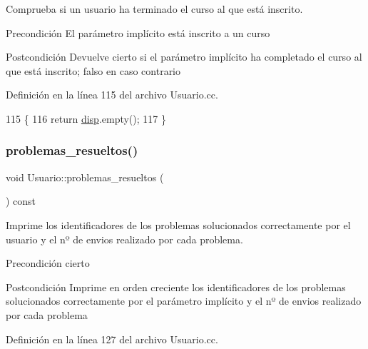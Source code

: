 Comprueba si un usuario ha terminado el curso al que está inscrito. 

\begin{DoxyPrecond}{Precondición}
El parámetro implícito está inscrito a un curso 
\end{DoxyPrecond}
\begin{DoxyPostcond}{Postcondición}
Devuelve cierto si el parámetro implícito ha completado el curso al que está inscrito; falso en caso contrario 
\end{DoxyPostcond}


Definición en la línea 115 del archivo Usuario.\+cc.


\begin{DoxyCode}
115                                        \{
116         \textcolor{keywordflow}{return} \mbox{\hyperlink{class_usuario_a4402178ca5b057733c675e3849718e96}{disp}}.empty();
117       \}
\end{DoxyCode}
\mbox{\label{class_usuario_a11b719ee95e8089a4f34c172c81f2a5b}} 
\subsubsection{\texorpdfstring{problemas\+\_\+resueltos()}{problemas\_resueltos()}}
{\footnotesize\ttfamily void Usuario\+::problemas\+\_\+resueltos (\begin{DoxyParamCaption}{ }\end{DoxyParamCaption}) const}



Imprime los identificadores de los problemas solucionados correctamente por el usuario y el nº de envios realizado por cada problema. 

\begin{DoxyPrecond}{Precondición}
cierto 
\end{DoxyPrecond}
\begin{DoxyPostcond}{Postcondición}
Imprime en orden creciente los identificadores de los problemas solucionados correctamente por el parámetro implícito y el nº de envios realizado por cada problema 
\end{DoxyPostcond}


Definición en la línea 127 del archivo Usuario.\+cc.


